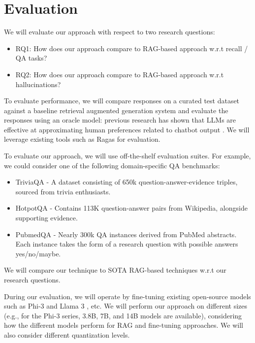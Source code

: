 \section{Evaluation}
We will evaluate our approach with respect to two research questions:

\begin{itemize}
\item RQ1: How does our approach compare to RAG-based approach w.r.t recall / QA tasks?
\item RQ2: How does our approach compare to RAG-based approach w.r.t hallucinations?
\end{itemize}

To evaluate performance, we will compare responses on a curated test dataset
against a baseline retrieval augmented generation system and evaluate the
responses using an oracle model: previous research has shown that LLMs are
effective at approximating human preferences related to chatbot output
\citep{zheng_judging_2023}. We will leverage existing tools such as Ragas
\citep{ragas} for evaluation.

To evaluate our approach, we will use off-the-shelf evaluation suites. For example, we could consider one of the following domain-specific QA benchmarks:

\begin{itemize}
\item TriviaQA \citep{joshi_triviaqa_2017} - A dataset consisting of 650k question-answer-evidence triples, sourced from trivia enthusiasts.
\item HotpotQA \citep{yang_hotpotqa_2018} - Contains 113K question-answer pairs from Wikipedia, alongside supporting evidence.
\item PubmedQA \citep{jin_pubmedqa_2019} - Nearly 300k QA instances derived from PubMed abstracts. Each instance takes the form of a research question with possible answers yes/no/maybe.
\end{itemize}

We will compare our technique to SOTA RAG-based techniques w.r.t our research questions.

During our evaluation, we will operate by fine-tuning existing open-source
models such as Phi-3 \citep{abdin_phi-3_2024} and Llama 3
\citep{dubey_llama_2024}, etc. We will perform our approach on different sizes
(e.g., for the Phi-3 series, 3.8B, 7B, and 14B models are available),
considering how the different models perform for RAG and fine-tuning approaches.
We will also consider different quantization levels.
